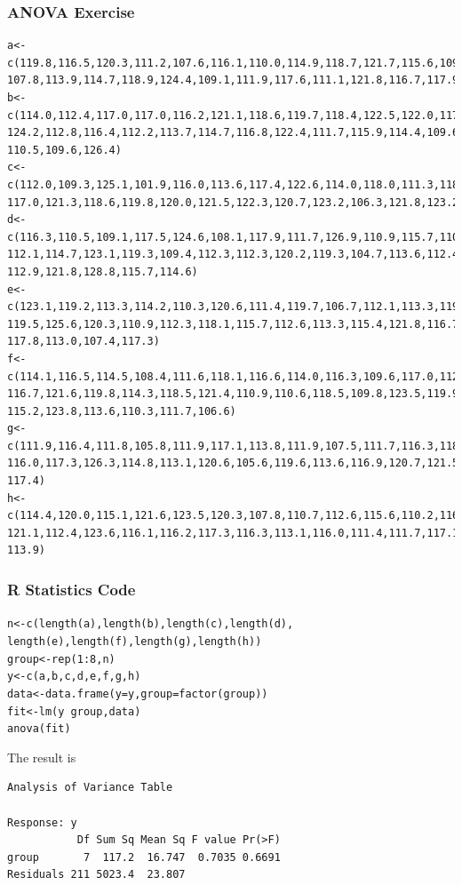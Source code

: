 \documentclass[xcolor=dvipsnames]{beamer}
\begin{document}
\begin{frame}[fragile]
  \frametitle{ANOVA Exercise}
  \begin{scriptsize}
\begin{verbatim}
a<-c(119.8,116.5,120.3,111.2,107.6,116.1,110.0,114.9,118.7,121.7,115.6,109.4,
107.8,113.9,114.7,118.9,124.4,109.1,111.9,117.6,111.1,121.8,116.7,117.9,117.9)
b<-c(114.0,112.4,117.0,117.0,116.2,121.1,118.6,119.7,118.4,122.5,122.0,117.8,
124.2,112.8,116.4,112.2,113.7,114.7,116.8,122.4,111.7,115.9,114.4,109.6,123.2,
110.5,109.6,126.4)
c<-c(112.0,109.3,125.1,101.9,116.0,113.6,117.4,122.6,114.0,118.0,111.3,118.4,
117.0,121.3,118.6,119.8,120.0,121.5,122.3,120.7,123.2,106.3,121.8,123.2)
d<-c(116.3,110.5,109.1,117.5,124.6,108.1,117.9,111.7,126.9,110.9,115.7,110.8,
112.1,114.7,123.1,119.3,109.4,112.3,112.3,120.2,119.3,104.7,113.6,112.4,115.2,
112.9,121.8,128.8,115.7,114.6)
e<-c(123.1,119.2,113.3,114.2,110.3,120.6,111.4,119.7,106.7,112.1,113.3,119.3,
119.5,125.6,120.3,110.9,112.3,118.1,115.7,112.6,113.3,115.4,121.8,116.7,109.1,
117.8,113.0,107.4,117.3)
f<-c(114.1,116.5,114.5,108.4,111.6,118.1,116.6,114.0,116.3,109.6,117.0,112.0,
116.7,121.6,119.8,114.3,118.5,121.4,110.9,110.6,118.5,109.8,123.5,119.9,114.1,
115.2,123.8,113.6,110.3,111.7,106.6)
g<-c(111.9,116.4,111.8,105.8,111.9,117.1,113.8,111.9,107.5,111.7,116.3,118.4,
116.0,117.3,126.3,114.8,113.1,120.6,105.6,119.6,113.6,116.9,120.7,121.5,117.1,
117.4)
h<-c(114.4,120.0,115.1,121.6,123.5,120.3,107.8,110.7,112.6,115.6,110.2,116.3,
121.1,112.4,123.6,116.1,116.2,117.3,116.3,113.1,116.0,111.4,111.7,117.1,116.2,
113.9)
\end{verbatim}
  \end{scriptsize}
\end{frame}

\begin{frame}[fragile]
  \frametitle{R Statistics Code}
\begin{scriptsize}
\begin{alltt}
n<-c(length(a),length(b),length(c),length(d),
length(e),length(f),length(g),length(h))
group<-rep(1:8,n)
y<-c(a,b,c,d,e,f,g,h)
data<-data.frame(y=y,group=factor(group))
fit<-lm(y~group,data)
anova(fit)
\end{alltt}
\end{scriptsize}
The result is
\begin{verbatim}
Analysis of Variance Table

Response: y
           Df Sum Sq Mean Sq F value Pr(>F)
group       7  117.2  16.747  0.7035 0.6691
Residuals 211 5023.4  23.807 
\end{verbatim}
\end{frame}
\end{document}
